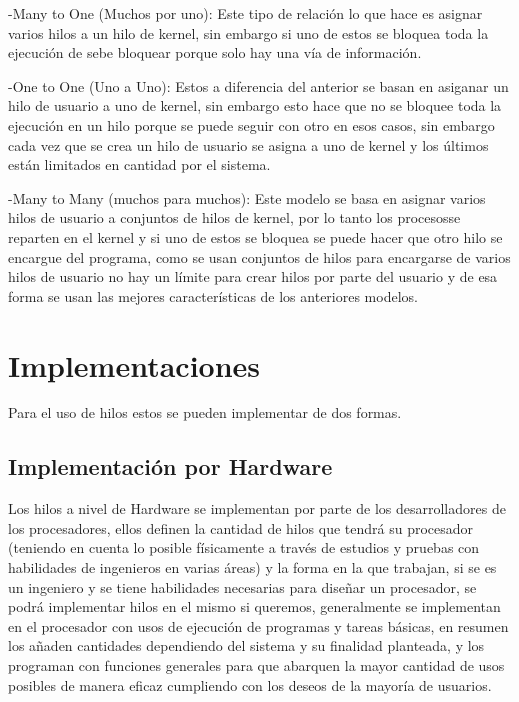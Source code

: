 \documentclass[letterpaper]{article}
\begin{document}
-Many to One (Muchos por uno): Este tipo de relación lo que hace es asignar varios hilos a un hilo de kernel, sin embargo si uno de estos se bloquea toda la ejecución de sebe bloquear porque solo hay una vía de información.

-One to One (Uno a Uno): Estos a diferencia del anterior se basan en asiganar un hilo de usuario a uno de kernel, sin embargo esto hace que no se bloquee toda la ejecución en un hilo porque se puede seguir con otro en esos casos, sin embargo cada vez que se crea un hilo de usuario se asigna a uno de kernel y los últimos están limitados en cantidad por el sistema.

-Many to Many (muchos para muchos): Este modelo se basa en asignar varios hilos de usuario a conjuntos de hilos de kernel, por lo tanto los procesosse reparten en el kernel y si uno de estos se bloquea se puede hacer que otro hilo se encargue del programa, como se usan conjuntos de hilos para encargarse de varios hilos de usuario no hay un límite para crear hilos por parte del usuario y de esa forma se usan las mejores características de los anteriores modelos.

\section{Implementaciones}
Para el uso de hilos estos se pueden implementar de dos formas.

\subsection{Implementación por Hardware}
Los hilos a nivel de Hardware se implementan por parte de los desarrolladores de los procesadores, ellos definen la cantidad de hilos que tendrá su procesador (teniendo en cuenta lo posible físicamente a través de estudios y pruebas con habilidades de ingenieros en varias áreas) y la forma en la que trabajan, si se es un ingeniero y se tiene habilidades necesarias para diseñar un procesador, se podrá implementar hilos en el mismo si queremos, generalmente se implementan en el procesador con usos de ejecución de programas y tareas básicas, en resumen los añaden cantidades dependiendo del sistema y su finalidad planteada, y los programan con funciones generales para que abarquen la mayor cantidad de usos posibles de manera eficaz cumpliendo con los deseos de la mayoría de usuarios. 
\end{document}
